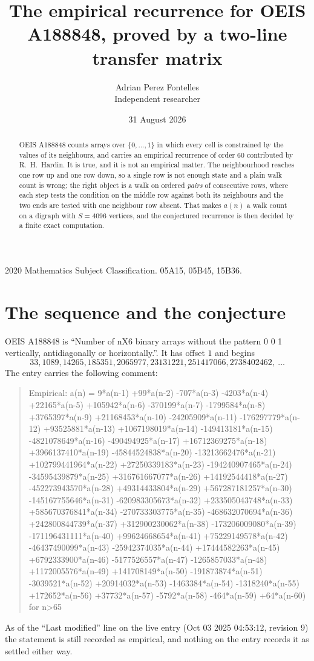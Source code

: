 \documentclass[11pt,a4paper]{article}
\title{The empirical recurrence for OEIS A188848, proved by a two-line transfer matrix}
\author{Adrian Perez Fontelles\\ \small Independent researcher}
\date{31 August 2026}
\theoremstyle{plain}
\theoremstyle{definition}
\begin{document}
\maketitle

\begin{abstract}
OEIS A188848 counts arrays over $\{0,\dots,1\}$ in which every cell is constrained by the
values of its neighbours, and carries an empirical recurrence of order $60$ contributed
by R.~H.~Hardin. It is true, and it is not an empirical matter. The neighbourhood reaches one
row up and one row down, so a single row is not enough state and a plain walk count
is wrong; the right object is a walk on ordered \emph{pairs} of consecutive rows, where
each step tests the condition on the middle row against both its neighbours and the two
ends are tested with one neighbour row absent. That makes $a(n)$ a walk count on a digraph
with $S=4096$ vertices, and the conjectured recurrence is then decided by a finite exact
computation.
\end{abstract}

\noindent\small 2020 Mathematics Subject Classification. 05A15, 05B45, 15B36.\normalsize

\section{The sequence and the conjecture}

OEIS A188848 is ``Number of nX6 binary arrays without the pattern 0 0 1 vertically, antidiagonally or horizontally.''. It has offset $1$ and begins
\[
33, 1089, 14265, 185351, 2065977, 23131221, 251417066, 2738402462,\ \dots
\]
The entry carries the following comment:
\begin{quote}\small
Empirical: a(n) = 9*a(n-1) +99*a(n-2) -707*a(n-3) -4203*a(n-4) +22165*a(n-5) +105942*a(n-6) -370199*a(n-7) -1799584*a(n-8) +3765397*a(n-9) +21168453*a(n-10) -24205909*a(n-11) -176297779*a(n-12) +93525881*a(n-13) +1067198019*a(n-14) -149413181*a(n-15) -4821078649*a(n-16) -490494925*a(n-17) +16712369275*a(n-18) +3966137410*a(n-19) -45844524838*a(n-20) -13213662476*a(n-21) +102799441964*a(n-22) +27250339183*a(n-23) -194240907465*a(n-24) -34595439879*a(n-25) +316761667077*a(n-26) +14192544418*a(n-27) -452273943570*a(n-28) +49314433804*a(n-29) +567287181257*a(n-30) -145167755646*a(n-31) -620983305673*a(n-32) +233505043748*a(n-33) +585670376841*a(n-34) -270733303775*a(n-35) -468632070694*a(n-36) +242800844739*a(n-37) +312900230062*a(n-38) -173206009080*a(n-39) -171196431111*a(n-40) +99624668654*a(n-41) +75229149578*a(n-42) -46437490099*a(n-43) -25942374035*a(n-44) +17444582263*a(n-45) +6792333900*a(n-46) -5177526557*a(n-47) -1265857033*a(n-48) +1172005576*a(n-49) +141708149*a(n-50) -191873874*a(n-51) -3039521*a(n-52) +20914032*a(n-53) -1463384*a(n-54) -1318240*a(n-55) +172652*a(n-56) +37732*a(n-57) -5792*a(n-58) -464*a(n-59) +64*a(n-60) for n>65
\end{quote}
As of the ``Last modified'' line on the live entry (Oct 03 2025 04:53:12, revision 9) the statement is
still recorded as empirical, and nothing on the entry records it as settled either way.
\end{document}
